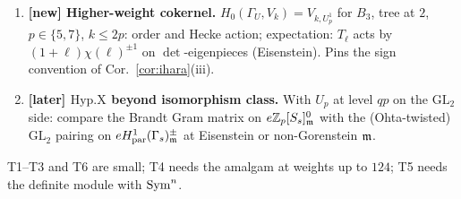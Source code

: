 \documentclass[11pt]{amsart}
\theoremstyle{plain}
\theoremstyle{definition}
\theoremstyle{remark}
\newcommand{\GL}{\mathrm{GL}}\newcommand{\SL}{\mathrm{SL}}\newcommand{\PGL}{\mathrm{PGL}}
\begin{document}
\begin{enumerate}[label=\textbf{T\arabic*}]
\item \textbf{[new] Higher-weight cokernel.} $H_0(\Gamma_U,V_k)=V_{k,U^1_p}$ for $B_3$, tree at $2$, $p\in\{5,7\}$, $k\le2p$: order and Hecke action; expectation: $T_\ell$ acts by $(1+\ell)\chi(\ell)^{\pm1}$ on $\det$-eigenpieces (Eisenstein). Pins the sign convention of Cor.~\ref{cor:ihara}(iii).
\item \textbf{[later] $\mathrm{Hyp.X}$ beyond isomorphism class.} With $U_p$ at level $qp$ on the $\GL_2$ side: compare the Brandt Gram matrix on $e\mathbb{Z}_p[S_s]^0_{\mathfrak{m}}$ with the (Ohta-twisted) $\GL_2$ pairing on $eH^1_{\rm par}(\Gamma_s)^{\pm}_{\mathfrak{m}}$ at Eisenstein or non-Gorenstein $\mathfrak{m}$.
\end{enumerate}
T1--T3 and T6 are small; T4 needs the amalgam at weights up to $124$; T5 needs the definite module with $\mathrm{Sym}^n$.

\end{document}
